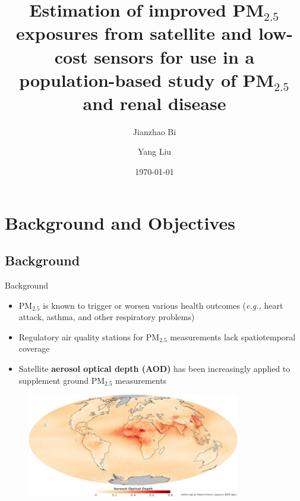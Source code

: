 \documentclass[handout]{beamer} %
\title[]{\large Estimation of improved PM$_{2.5}$ exposures from satellite and low-cost sensors for use in a population-based study of PM$_{2.5}$ and renal disease}
\author[]{Jianzhao Bi\inst{1} \and \textcolor[rgb]{0.1,0.6,0.1}{Yang Liu}\inst{1}\inst{*}}
\institute[Emory University] %
{
  \inst{1}%
  Environmental Health Sciences\\
  Emory University
 }
\date{\today}
\begin{document}
\begin{frame}
  \titlepage
\end{frame}

\section{Background and Objectives}
\subsection{Background}
\begin{frame}{Background}
    \begin{itemize}
        \item<1-> PM$_{2.5}$ is known to trigger or worsen various health outcomes (\textit{e.g.,} heart attack, asthma, and other respiratory problems)
        \item<2-> Regulatory air quality stations for PM$_{2.5}$ measurements lack spatiotemporal coverage
        \item<3-> Satellite \textbf{aerosol optical depth (AOD)} has been increasingly applied to supplement ground PM$_{2.5}$ measurements
    \end{itemize}
    \vspace{-0.25cm}
    \begin{figure}
        \centering
        \includegraphics[width=0.83\textwidth]{img/satellite_aod.jpg}
        \label{fig:pm25}
    \end{figure}
\end{frame}
\end{document}
